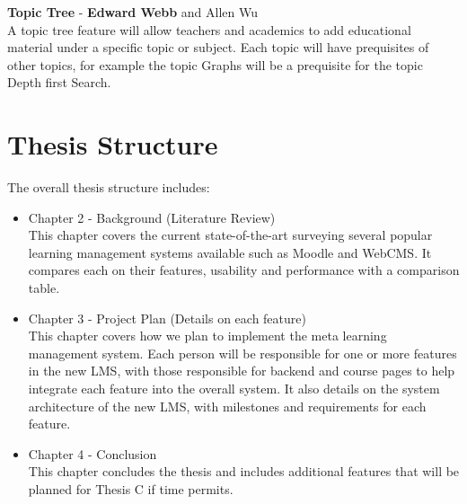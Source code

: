 \textbf{Topic Tree} - \textbf{Edward Webb} and Allen Wu \\
A topic tree feature will allow teachers and academics to add educational material under a specific topic or subject. Each topic will have prequisites of other topics, for example the topic Graphs will be a prequisite for the topic Depth first Search.

\section{Thesis Structure}
The overall thesis structure includes:

\begin{itemize}
\item Chapter 2 - Background (Literature Review) \\
This chapter covers the current state-of-the-art surveying several popular learning management systems available such as Moodle and WebCMS. It compares each on their features, usability and performance with a comparison table.
\item Chapter 3 - Project Plan (Details on each feature) \\
This chapter covers how we plan to implement the meta learning management system. Each person will be responsible for one or more features in the new LMS, with those responsible for backend and course pages to help integrate each feature into the overall system. It also details on the system architecture of the new LMS, with milestones and requirements for each feature.
\item Chapter 4 - Conclusion \\
This chapter concludes the thesis and includes additional features that will be planned for Thesis C if time permits.
\end{itemize}
